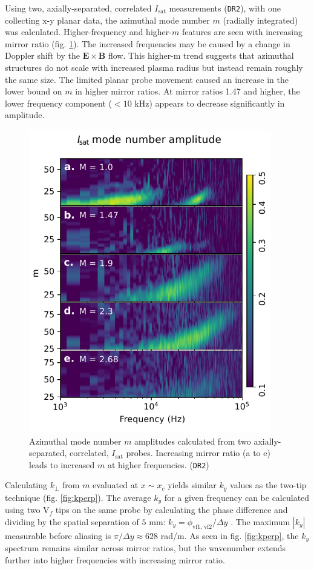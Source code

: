 Using two, axially-separated, correlated $I_\text{sat}$ measurements (\texttt{DR2}), with one collecting x-y planar data, the azimuthal mode number $m$ (radially integrated) was calculated. Higher-frequency and higher-$m$ features are seen with increasing mirror ratio (fig. \ref{fig:isat-m-num}). The increased frequencies may be caused by a  change in Doppler shift by the $\boldsymbol{E \times B}$ flow. This higher-m trend suggests that azimuthal structures do not scale with increased plasma radius but instead remain roughly the same size. The limited planar probe movement caused an increase in the lower bound on $m$  in higher mirror ratios. At mirror ratios 1.47 and higher, the lower frequency component ($< 10$ kHz) appears to decrease significantly in amplitude. 
\begin{figure}
    \centering
    \includegraphics[width=300pt]{figures/fig17.pdf}
    \caption[Azimuthal mode number $m$ amplitudes of $I_\text{sat}$ fluctuations]{Azimuthal mode number $m$ amplitudes calculated from two axially-separated, correlated, $I_\text{sat}$ probes. Increasing mirror ratio (a to e) leads to increased $m$ at higher frequencies. (\texttt{DR2})}
    \label{fig:isat-m-num}
\end{figure}
Calculating $k_\perp$ from $m$ evaluated at $x \sim x_c$ yields similar $k_y$ values as the two-tip technique (fig. \ref{fig:kperp}). The average $k_y$ for a given frequency can be calculated using two V$_f$ tips on the same probe by calculating the phase difference and dividing by the spatial separation of $5$ mm: $k_y = \phi_{\text{vf1, vf2}} / \Delta y$ \cite{Powers-twoprobe-ky}. The maximum $|k_y|$ measurable before aliasing is $\pi / \Delta y \approx 628$ rad/m. As seen in fig. \ref{fig:kperp}, the $k_y$ spectrum remains similar across mirror ratios, but the wavenumber extends further into higher frequencies with increasing mirror ratio. 
